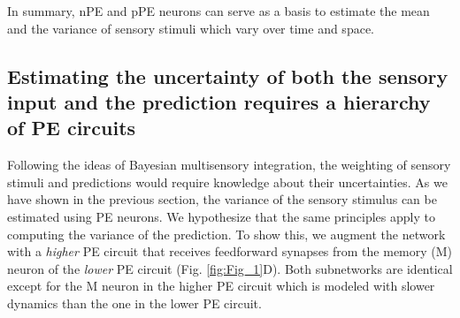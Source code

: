 \documentclass[10pt,a4paper]{article}
\begin{document}
In summary, nPE and pPE neurons can serve as a basis to estimate the mean and the variance of sensory stimuli which vary over time and space.


\subsection*{Estimating the uncertainty of both the sensory input and the prediction requires a hierarchy of PE circuits}
%
Following the ideas of Bayesian multisensory integration, the weighting of sensory stimuli and predictions would require knowledge about their uncertainties. As we have shown in the previous section, the variance of the sensory stimulus can be estimated using PE neurons. We hypothesize that the same principles apply to computing the variance of the prediction. To show this, we augment the network with a \textit{higher} PE circuit that receives feedforward synapses from the memory (M) neuron of the \textit{lower} PE circuit (Fig. \ref{fig:Fig_1}D). Both subnetworks are identical except for the M neuron in the higher PE circuit which is modeled with slower dynamics than the one in the lower PE circuit.
%
\end{document}
